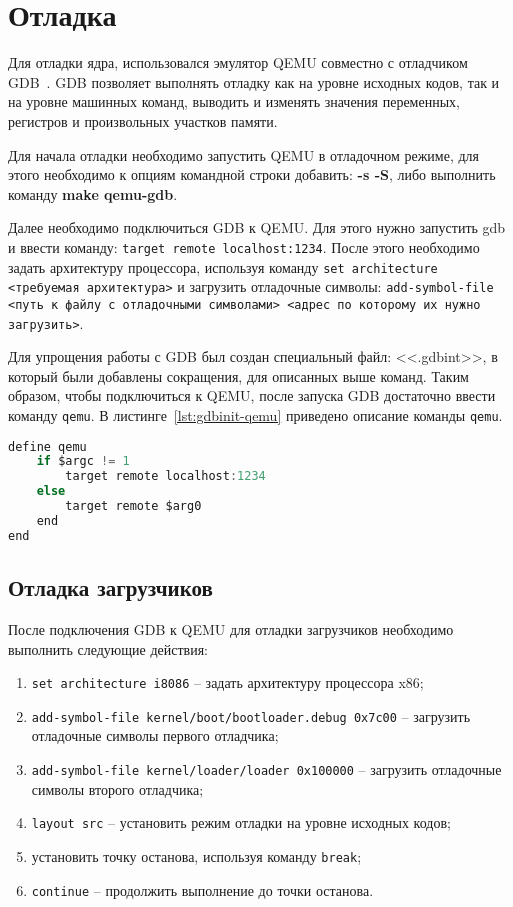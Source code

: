 \section{Отладка}
Для отладки ядра, использовался эмулятор QEMU совместно с отладчиком GDB~\cite{gdb}.
GDB позволяет выполнять отладку как на уровне исходных кодов, так и на уровне машинных команд,
выводить и изменять значения переменных, регистров и произвольных участков памяти.

Для начала отладки необходимо запустить QEMU в отладочном режиме, для этого необходимо
к опциям командной строки добавить: \textbf{-s -S}, либо выполнить команду \textbf{make qemu-gdb}.

Далее необходимо подключиться GDB к QEMU. Для этого нужно запустить gdb и ввести команду:
\texttt{target remote localhost:1234}. После этого необходимо задать архитектуру процессора,
используя команду \texttt{set architecture <требуемая архитектура>} и загрузить отладочные
символы: \texttt{add-symbol-file <путь к файлу с отладочными символами> <адрес по которому их нужно загрузить>}.

Для упрощения работы с GDB был создан специальный файл: <<.gdbint>>, в который были добавлены
сокращения, для описанных выше команд. Таким образом, чтобы подключиться к QEMU, после запуска
GDB достаточно ввести команду \texttt{qemu}. В листинге~\ref{lst:gdbinit-qemu} приведено описание
команды \texttt{qemu}.

\begin{lstlisting}[language=C, caption={Реализация команды <<qemu>>}, label={lst:gdbinit-qemu}]
define qemu
	if $argc != 1
		target remote localhost:1234
	else
		target remote $arg0
	end
end
\end{lstlisting}

\subsection{Отладка загрузчиков}
После подключения GDB к QEMU для отладки загрузчиков необходимо выполнить следующие действия:
\begin{enumerate}[1.]
	\item \texttt{set architecture i8086} -- задать архитектуру процессора x86;
	\item \texttt{add-symbol-file kernel/boot/bootloader.debug 0x7c00} -- загрузить отладочные
		символы первого отладчика;
	\item \texttt{add-symbol-file kernel/loader/loader 0x100000} -- загрузить отладочные символы
		второго отладчика;
	\item \texttt{layout src} -- установить режим отладки на уровне исходных кодов;
	\item установить точку останова, используя команду \texttt{break};
	\item \texttt{continue} -- продолжить выполнение до точки останова.
\end{enumerate}

